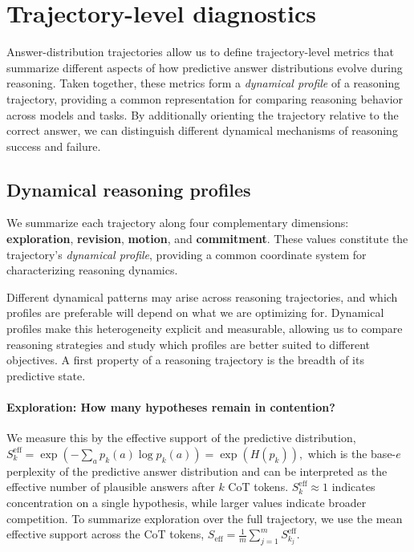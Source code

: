 \documentclass{article}
\begin{document}
\section{Trajectory-level diagnostics}
\label{sec:diagnostics}

Answer-distribution trajectories allow us to define trajectory-level metrics that summarize different aspects of how predictive answer distributions evolve during reasoning. Taken together, these metrics form a \emph{dynamical profile} of a reasoning trajectory, providing a common representation for comparing reasoning behavior across models and tasks. By additionally orienting the trajectory relative to the correct answer, we can distinguish different dynamical mechanisms of reasoning success and failure.

\subsection{Dynamical reasoning profiles}
\label{sec:target_agnostic}

We summarize each trajectory along four complementary dimensions: \textbf{exploration}, \textbf{revision}, \textbf{motion}, and \textbf{commitment}. These values constitute the trajectory's \emph{dynamical profile}, providing a common coordinate system for characterizing reasoning dynamics.

Different dynamical patterns may arise across reasoning trajectories, and which profiles are preferable will depend on what we are optimizing for. Dynamical profiles make this heterogeneity explicit and measurable, allowing us to compare reasoning strategies and study which profiles are better suited to different objectives. A first property of a reasoning trajectory is the breadth of its predictive state.

\paragraph{Exploration: How many hypotheses remain in contention?} We measure this by the effective support of the predictive distribution,
$
S_k^{\mathrm{eff}} = \exp\left( -\sum_a p_k(a)\log p_k(a) \right) = \exp(H(p_k)),
$
which is the base-$e$ perplexity of the predictive answer distribution and can be interpreted as the effective number of plausible answers after $k$ CoT tokens. $S_k^{\mathrm{eff}}\approx 1$ indicates concentration on a single hypothesis, while larger values indicate broader competition. To summarize exploration over the full trajectory, we use the mean effective support across the CoT tokens,
\(
S_{\mathrm{eff}}
=
\frac{1}{m}
\sum_{j=1}^{m}
S^{\mathrm{eff}}_{k_j}.
\)
\end{document}
